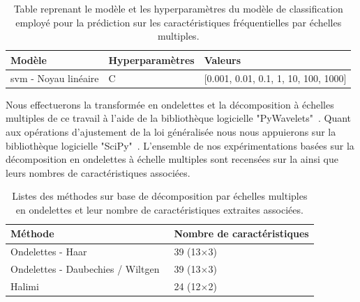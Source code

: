 \begin{table}[H]
    \centering
    \begin{tabular}{lll}
        \toprule
        \textbf{Modèle}                                 & \textbf{Hyperparamètres}  & \textbf{Valeurs}                          \\ \midrule
        \gls{svm} - Noyau linéaire                      & C                         & [0.001, 0.01, 0.1, 1, 10, 100, 1000]      \\ 
        \bottomrule 
    \end{tabular} 
    \caption{Table reprenant le modèle et les hyperparamètres du modèle de classification employé pour la prédiction sur les caractéristiques fréquentielles par échelles multiples.}
    \label{tab:parameters_image_improvement_multiscale_frequency}
\end{table}\par

Nous effectuerons la transformée en ondelettes et la décomposition à échelles multiples de ce travail à l'aide de la bibliothèque logicielle "PyWavelets"~\cite{lee2006}. Quant aux opérations d'ajustement de la loi généralisée nous nous appuierons sur la bibliothèque logicielle "SciPy"~\cite{Virtanen2020}. L'ensemble de nos expérimentations basées sur la décomposition en ondelettes à échelle multiples sont recensées sur la  ainsi que leurs nombres de caractéristiques associées.\par

\begin{table}[h]
    \centering
    \begin{tabular}{ll}
        \toprule
        \textbf{Méthode}                                    & \textbf{Nombre de caractéristiques}   \\ \hline
        Ondelettes - Haar                                   & 39 (13$\times$3)   \\ \hline
        Ondelettes - Daubechies / Wiltgen~\cite{Wiltgen2008}& 39 (13$\times$3)   \\ \hline
        Halimi~\cite{Halimi2017a}                           & 24 (12$\times$2)   \\
        \bottomrule
    \end{tabular}
    \caption{Listes des méthodes sur base de décomposition par échelles multiples en ondelettes et leur nombre de caractéristiques extraites associées.}
    \label{tab:wavelet_image_improvement_multiscale_nb_features}
\end{table}\par

